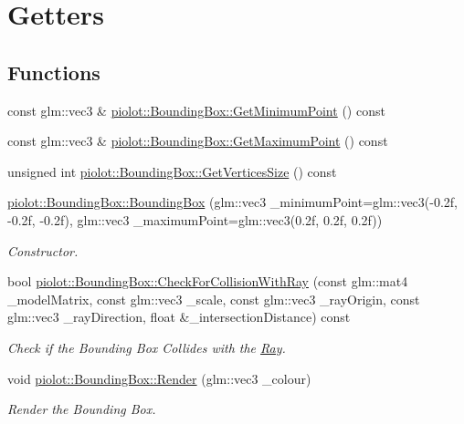 \hypertarget{group___getters}{}\section{Getters}
\label{group___getters}
\subsection*{Functions}
\begin{DoxyCompactItemize}
\item 
const glm\+::vec3 \& \mbox{\hyperlink{group___getters_ga1534921bb22645320614b4cf02268906}{piolot\+::\+Bounding\+Box\+::\+Get\+Minimum\+Point}} () const
\item 
const glm\+::vec3 \& \mbox{\hyperlink{group___getters_gafd9222c8fb47c5484c873ace9d66a37d}{piolot\+::\+Bounding\+Box\+::\+Get\+Maximum\+Point}} () const
\item 
unsigned int \mbox{\hyperlink{group___getters_ga57651f343f21133fc6c89c8c5619ed84}{piolot\+::\+Bounding\+Box\+::\+Get\+Vertices\+Size}} () const
\item 
\mbox{\hyperlink{group___getters_ga699e27e8e646be7a0a47f89abb35778d}{piolot\+::\+Bounding\+Box\+::\+Bounding\+Box}} (glm\+::vec3 \+\_\+minimum\+Point=glm\+::vec3(-\/0.\+2f, -\/0.\+2f, -\/0.\+2f), glm\+::vec3 \+\_\+maximum\+Point=glm\+::vec3(0.\+2f, 0.\+2f, 0.\+2f))
\begin{DoxyCompactList}\small\item\em Constructor. \end{DoxyCompactList}\item 
bool \mbox{\hyperlink{group___getters_ga552fcdb461cdc71c5da0fed7b486246d}{piolot\+::\+Bounding\+Box\+::\+Check\+For\+Collision\+With\+Ray}} (const glm\+::mat4 \+\_\+model\+Matrix, const glm\+::vec3 \+\_\+scale, const glm\+::vec3 \+\_\+ray\+Origin, const glm\+::vec3 \+\_\+ray\+Direction, float \&\+\_\+intersection\+Distance) const
\begin{DoxyCompactList}\small\item\em Check if the Bounding Box Collides with the \mbox{\hyperlink{classpiolot_1_1_ray}{Ray}}. \end{DoxyCompactList}\item 
void \mbox{\hyperlink{group___getters_ga3ef9f966674be7fa0448d388b7a3d776}{piolot\+::\+Bounding\+Box\+::\+Render}} (glm\+::vec3 \+\_\+colour)
\begin{DoxyCompactList}\small\item\em Render the Bounding Box. \end{DoxyCompactList}\end{DoxyCompactItemize}


